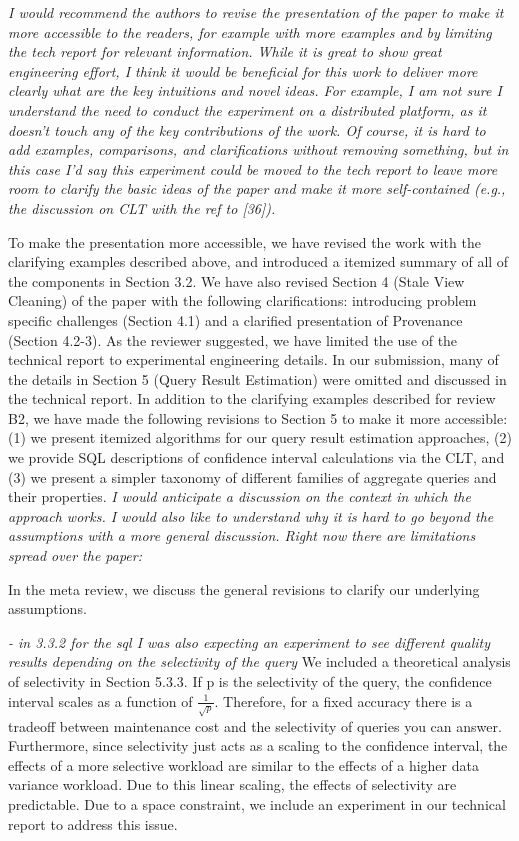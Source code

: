 \vspace{1em}
\emph{I would recommend the authors to revise the presentation of the paper to make it more accessible to the readers, for example with more examples and by limiting the tech report for relevant information. While it is great to show great engineering effort, I think it would be beneficial for this work to deliver more clearly what are the key intuitions and novel ideas. For example, I am not sure I understand the need to conduct the experiment on a distributed platform, as it doesn't touch any of the key contributions of the work. Of course, it is hard to add examples, comparisons, and clarifications without removing something, but in this case I'd say this experiment could be moved to the tech report to leave more room to clarify the basic ideas of the paper and make it more self-contained (e.g., the discussion on CLT with the ref to [36]).}

To make the presentation more accessible, we have revised the work with the clarifying examples described above, and introduced a itemized summary of all of the components in Section 3.2. We have also revised Section 4 (Stale View Cleaning) of the paper with the following clarifications: introducing problem specific challenges (Section 4.1) and a clarified presentation of Provenance (Section 4.2-3). As the reviewer suggested, we have limited the use of the technical report to experimental engineering details. In our submission, many of the details in Section 5 (Query Result Estimation) were omitted and discussed in the technical report. In addition to the clarifying examples described for review B2, we have made the following revisions to Section 5 to make it more accessible: (1) we present itemized algorithms for our query result estimation approaches, (2) we provide SQL descriptions of confidence interval calculations via the CLT, and (3) we present a simpler taxonomy of different families of aggregate queries and their properties. 
\vspace{1em}
\emph{I would anticipate a discussion on the context in which the approach works. I would also like to understand why it is hard to go beyond the assumptions with a more general discussion. Right now there are limitations spread over the paper: }

In the meta review, we discuss the general revisions to clarify our underlying assumptions.

\noindent\emph{- in 3.3.2 for the sql I was also expecting an experiment to see different quality results depending on the selectivity of the query}
We included a theoretical analysis of selectivity in Section 5.3.3. If p is the selectivity of the query, the confidence interval scales as a function of $\frac{1}{\sqrt{p}}$. Therefore, for a fixed accuracy there is a tradeoff between maintenance cost and the selectivity of queries you can answer. Furthermore, since selectivity just acts as a scaling to the confidence interval, the effects of a more selective workload are similar to the effects of a higher data variance workload. Due to this linear scaling, the effects of selectivity are predictable. Due to a space constraint, we include an experiment in our technical report to address this issue.

